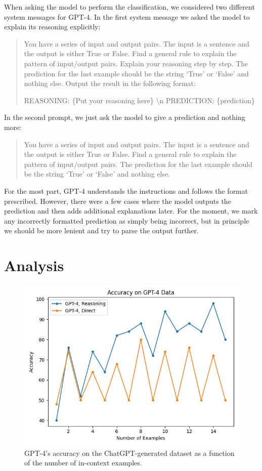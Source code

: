 \documentclass{article}
\begin{document}
When asking the model to perform the classification, we considered two different system messages for GPT-4. In the first system message we asked the model to explain its reasoning explicitly:
\begin{center}
\begin{quote}
You have a series of input and output pairs. The input is a sentence and the output is either True or False.
Find a general rule to explain the pattern of input/output pairs. Explain your reasoning step by step.
The prediction for the last example should be the string `True' or `False' and nothing else.
Output the result in the following format:

REASONING: \{Put your reasoning here\} \textbackslash n
PREDICTION: \{prediction\}
\end{quote}
\end{center}
In the second prompt, we just ask the model to give a prediction and nothing more:
\begin{center}
\begin{quote}
You have a series of input and output pairs. The input is a sentence and the output is either True or False.
Find a general rule to explain the pattern of input/output pairs.
The prediction for the last example should be the string `True' or `False' and nothing else.
\end{quote}
\end{center}
For the most part, GPT-4 understands the instructions and follows the format prescribed. However, there were a few cases where the model outputs the prediction and then adds additional explanations later. For the moment, we mark any incorrectly formatted prediction as simply being incorrect, but in principle we should be more lenient and try to parse the output further.

\section{Analysis}
\begin{figure}
\centering
\includegraphics[scale=.6]{./figures/accuracy_GPT.png}
\caption{GPT-4's accuracy on the ChatGPT-generated dataset as a function of the number of in-context examples.}
\label{plot:accuracy_GPT}
\end{figure}
\end{document}
